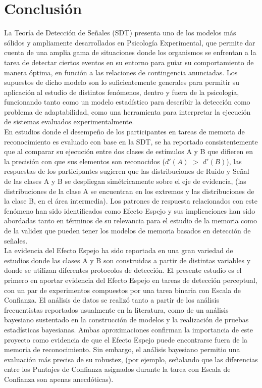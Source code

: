 
\chapter{Conclusión} %

\label{Cap_Conclusion} %

La Teoría de Detección de Señales (SDT) presenta uno de los modelos más sólidos y ampliamente desarrollados en Psicología Experimental, que permite dar cuenta de una amplia gama de situaciones donde los organismos se enfrentan a la tarea de detectar ciertos eventos en su entorno para guiar su comportamiento de manera óptima, en función a las relaciones de contingencia anunciadas. Los supuestos de dicho modelo son lo suficientemente generales para permitir su aplicación al estudio de distintos fenómenos, dentro y fuera de la psicología, funcionando tanto como un modelo estadístico para describir la detección como problema de adaptabilidad, como una herramienta para interpretar la ejecución de sistemas evaluados experimentalmente.\\

En estudios donde el desempeño de los participantes en tareas de memoria de reconocimiento es evaluado con base en la SDT, se ha reportado consistentemente que al comparar su ejecución entre dos clases de estímulos A y B que difieren en la precisión con que sus elementos son reconocidos ($d'(A)$ $>$ $d'(B)$), las respuestas de los participantes sugieren que las distribuciones de Ruido y Señal de las clases A y B se despliegan simétricamente sobre el eje de evidencia, (las distribuciones de la clase A se encuentran en los extremos y las distribuciones de la clase B, en el área intermedia). Los patrones de respuesta relacionados con este fenómeno han sido identificados como Efecto Espejo y sus implicaciones han sido abordadas tanto en términos de su relevancia para el estudio de la memoria como de la validez que pueden tener los modelos de memoria basados en detección de señales.\\

La evidencia del Efecto Espejo ha sido reportada en una gran variedad de estudios donde las clases A y B son construidas a partir de distintas variables y donde se utilizan diferentes protocolos de detección. El presente estudio es el primero en aportar evidencia del Efecto Espejo en tareas de detección perceptual, con un par de experimentos compuestos por una tarea binaria con Escala de Confianza. El análisis de datos se realizó tanto a partir de los análisis frecuentistas reportados usualmente en la literatura, como de un análisis bayesiano sustentado en la construcción de modelos y la realización de pruebas estadísticas bayesianas. Ambas aproximaciones confirman la importancia de este proyecto como evidencia de que el Efecto Espejo puede encontrarse fuera de la memoria de reconocimiento. Sin embargo, el análisis bayesiano permitio una evaluación más precisa de su robustez, (por ejemplo, señalando que las diferencias entre los Puntajes de Confianza asignados durante la tarea con Escala de Confianza son apenas anecdóticas).\\

